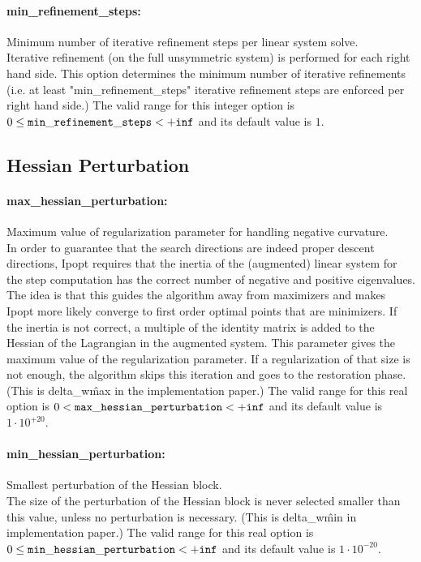 \paragraph{min\_refinement\_steps:}\label{sec:min_refinement_steps} Minimum number of iterative refinement steps per linear system solve. $\;$ \\
 Iterative refinement (on the full unsymmetric
system) is performed for each right hand side. 
This option determines the minimum number of
iterative refinements (i.e. at least
"min\_refinement\_steps" iterative refinement
steps are enforced per right hand side.) The valid range for this integer option is
$0 \le {\tt min\_refinement\_steps } <  {\tt +inf}$
and its default value is $1$.


\subsection{Hessian Perturbation}

\paragraph{max\_hessian\_perturbation:}\label{sec:max_hessian_perturbation} Maximum value of regularization parameter for handling negative curvature. $\;$ \\
 In order to guarantee that the search directions
are indeed proper descent directions, Ipopt
requires that the inertia of the (augmented)
linear system for the step computation has the
correct number of negative and positive
eigenvalues. The idea is that this guides the
algorithm away from maximizers and makes Ipopt
more likely converge to first order optimal
points that are minimizers. If the inertia is not
correct, a multiple of the identity matrix is
added to the Hessian of the Lagrangian in the
augmented system. This parameter gives the
maximum value of the regularization parameter. If
a regularization of that size is not enough, the
algorithm skips this iteration and goes to the
restoration phase. (This is delta\_w\^max in the
implementation paper.) The valid range for this real option is 
$0 <  {\tt max\_hessian\_perturbation } <  {\tt +inf}$
and its default value is $1 \cdot 10^{+20}$.


\paragraph{min\_hessian\_perturbation:}\label{sec:min_hessian_perturbation} Smallest perturbation of the Hessian block. $\;$ \\
 The size of the perturbation of the Hessian block
is never selected smaller than this value, unless
no perturbation is necessary. (This is
delta\_w\^min in implementation paper.) The valid range for this real option is 
$0 \le {\tt min\_hessian\_perturbation } <  {\tt +inf}$
and its default value is $1 \cdot 10^{-20}$.


